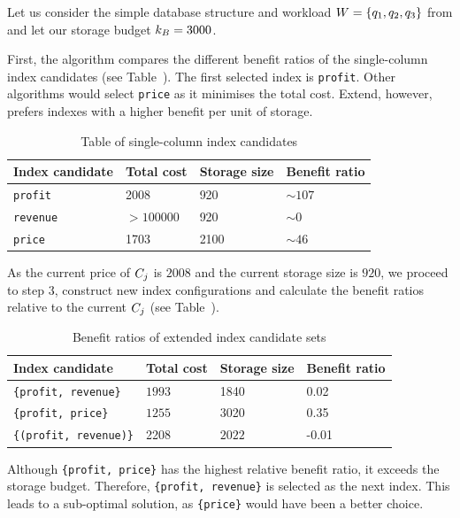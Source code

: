 \begin{example}
Let us consider the simple database structure and workload $W = \{q_1, q_2, q_3\}$ from  and let our storage budget $k_B = 3000$.

First, the algorithm compares the different benefit ratios of the single-column index candidates (see Table~). The first selected index is \texttt{profit}. Other algorithms would select \texttt{price} as it minimises the total cost. Extend, however, prefers indexes with a higher benefit per unit of storage.

\begin{table}[!ht]
    \centering
    \caption{Table of single-column index candidates}
    \def\arraystretch{1.25}
    \begin{tabular}{llll}
        \toprule
        \textbf{Index candidate} & \textbf{Total cost} & \textbf{Storage size} & \textbf{Benefit ratio}  \\
        \midrule
        \texttt{profit} & 2008 &920& $\sim 107$\\
        \texttt{revenue} & $> 100000$ &920&$\sim 0$ \\
        \texttt{price} & 1703 &2100& $\sim 46$ \\
        \bottomrule
    \end{tabular}
\end{table}

As the current price of $C_{j}$ is $2008$ and the current storage size is $920$, we proceed to step 3, construct new index configurations and calculate the benefit ratios relative to the current $C_{j}$ (see Table~).

\begin{table}[!ht]
    \centering
    \caption{Benefit ratios of extended index candidate sets}
    \def\arraystretch{1.25}
    \begin{tabular}{llll}
        \toprule
        \textbf{Index candidate} & \textbf{Total cost} & \textbf{Storage size} & \textbf{Benefit ratio} \\
        \midrule
        \texttt{\{profit, revenue\}} & $1993$ & 1840 & 0.02 \\
        \texttt{\{profit, price\}} &$1255$ & 3020 & 0.35\\
        \texttt{\{(profit, revenue)\}} & 2208 & $2022$ & -0.01 \\
        \bottomrule
    \end{tabular}
\end{table}

Although \texttt{\{profit, price\}} has the highest relative benefit ratio, it exceeds the storage budget. Therefore, \texttt{\{profit, revenue\}} is selected as the next index. This leads to a sub-optimal solution, as \texttt{\{price\}} would have been a better choice.
\end{example}

